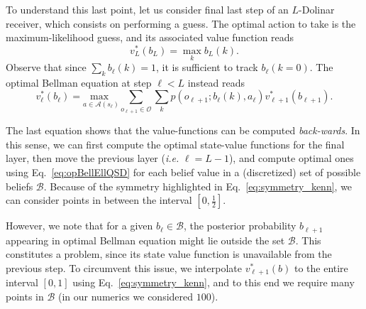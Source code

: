 To understand this last point, let us consider final last step of an $L$-Dolinar receiver, which consists on performing a guess. The optimal action to take is the maximum-likelihood guess, and its associated value function reads
\begin{equation}\label{eq:opBellLQSD}
v^{*}_{L}(b_{L})= \max_{k} b_{L}(k).
\end{equation}
Observe that since $\sum_k b_\ell(k)=1$, it is sufficient to track $b_\ell(k=0)$. The optimal Bellman equation at step $\ell<L$ instead reads
\begin{equation}\label{eq:opBellEllQSD}
v^{*}_{\ell}(b_{\ell})=\underset{a\in\mathcal{A}(s_{\ell})}{\text{max }} \sum_{o_{\ell+1}\in\mathcal{O}} \sum_k p(o_{\ell+1}; b_\ell(k), a_\ell)v^{*}_{\ell+1}(b_{\ell+1}).
\end{equation}

%
The last equation shows that the value-functions can be computed \textit{back-wards}. In this sense, we can first compute the optimal state-value functions for the final layer, then move the previous layer (\textit{i.e.} $\ell = L-1$), and compute optimal ones using Eq.~\eqref{eq:opBellEllQSD} for each belief value in a (discretized) set of possible beliefs $\mathcal{B}$. Because of the symmetry highlighted in Eq.~\ref{eq:symmetry_kenn}, we can consider points in between the interval $[0,\frac{1}{2}]$.

However, we note that for a given $b_\ell \in \mathcal{B}$, the posterior probability $b_{\ell+1}$ appearing in optimal Bellman equation might lie outside the set $\mathcal{B}$. This constitutes a problem, since its state value function is unavailable from the previous step. To circumvent this issue, we interpolate $v_{\ell+1}^*(b)$ to the entire interval $[0,1]$ using Eq.~\ref{eq:symmetry_kenn}, and to this end we require many points in $\mathcal{B}$ (in our numerics we considered $100$).

